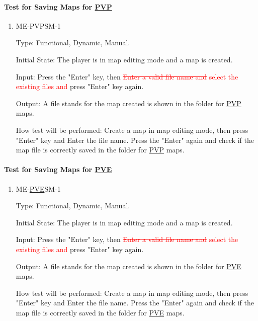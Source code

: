 \documentclass[12pt, titlepage]{article}
\begin{document}
\paragraph{Test for Saving Maps for \underline{PVP}}

\begin{enumerate}

\item{ME-PVPSM-1\\}

Type: Functional, Dynamic, Manual.
					
Initial State: The player is in map editing mode and a map is created.
					
Input: Press the "Enter" key, then \textcolor{red}{\sout{Enter a valid file name and} select the existing files and } press "Enter" key again.
					
Output: A file stands for the map created is shown in the folder for \underline{PVP} maps.
					
How test will be performed: Create a map in map editing mode, then press "Enter" key and Enter the file name. Press the "Enter" again and check if the map file is correctly saved in the folder for \underline{PVP} maps.

\end{enumerate}

\paragraph{Test for Saving Maps for \underline{PVE}}

\begin{enumerate}

\item{ME-\underline{PVE}SM-1\\}

Type: Functional, Dynamic, Manual.
					
Initial State: The player is in map editing mode and a map is created.
					
Input: Press the "Enter" key, then \textcolor{red}{\sout{Enter a valid file name and} select the existing files and } press "Enter" key again.
					
Output: A file stands for the map created is shown in the folder for \underline{PVE} maps.
					
How test will be performed: Create a map in map editing mode, then press "Enter" key and Enter the file name. Press the "Enter" again and check if the map file is correctly saved in the folder for \underline{PVE} maps.

\end{enumerate}
\end{document}
